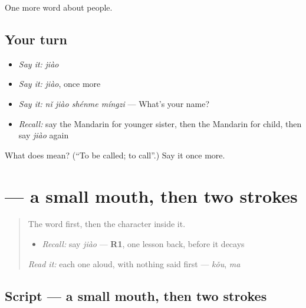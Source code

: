 \begin{grammarlens}[title={What you've built}]
One more word about people.
\end{grammarlens}

\subsection*{Your turn}
\begin{itemize}
\raggedright
  \item \emph{Say it:} \emph{jiào}
  \item \emph{Say it:} \emph{jiào}, once more
  \item \emph{Say it:} \emph{nǐ jiào shénme míngzi} — What's your name?
  \item \emph{Recall:} say the Mandarin for younger sister, then the Mandarin for child, then say \emph{jiào} again
\end{itemize}

\begin{tcolorbox}[breakable,colback=teal!4,colframe=teal!35!black,title={Before you move on}]
What does  mean? (\textquotedblleft{}To be called; to call\textquotedblright{}.) Say it once more.
\end{tcolorbox}
\section[\texorpdfstring{\zh{叫} (jiào)}{叫 (jiào)}]{ — a small mouth, then two strokes}

\label{lesson:ZH-W34-jiao}



\begin{quote}
The word first, then the character inside it.

\begin{itemize}
\raggedright
  \item \emph{Recall:} say \emph{jiào} — \textbf{R1}, one lesson back, before it decays
\end{itemize}

\begin{quote}
 
\end{quote}

\emph{Read it:} each one aloud, with nothing said first — \emph{kǒu}, \emph{ma}
\end{quote}

\subsection*{Script — a small mouth, then two strokes}

